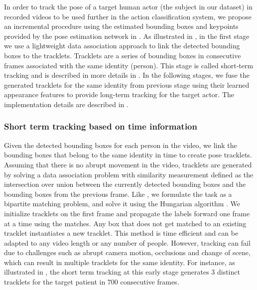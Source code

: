 In order to track the pose of a target human actor (the subject in our dataset) in recorded videos to be used further in the action classification system, we propose an incremental procedure using the estimated bounding boxes and keypoints provided by the pose estimation network in . As illustrated in , in the first stage we use a lightweight data association approach to link the detected bounding boxes to the tracklets. Tracklets are a series of bounding boxes in consecutive frames associated with the same identity (person). This stage is called short-term tracking and is described in more details in . In the following stages, we fuse the generated tracklets for the same identity from previous stage using their learned appearance features to provide long-term tracking for the target actor. The implementation details are described in .
\\
\subsubsection{Short term tracking based on time information}
\Tracking
\label{sec:Hungarian}
Given the detected bounding boxes for each person in the video, we link the bounding boxes that belong to the same identity in time to create pose tracklets. Assuming that there is no abrupt movement in the video, tracklets are generated by solving a data association problem with similarity measurement defined as the intersection over union between the currently detected bounding boxes and the bounding boxes from the previous frame. Like \cite{girdhar2018detect, pirsiavash2011globally}, we formulate the task as a bipartite matching problem, and solve it using the
Hungarian algorithm \cite{kuhn2005hungarian}. We initialize tracklets on the first frame and propagate the labels forward one frame at a time using the matches. Any box that does not get matched to an existing tracklet instantiates a new tracklet. This method is time efficient and can be adapted to any video length or any number of people. However, tracking can fail due to challenges such as abrupt camera motion, occlusions and change of scene, which can result in multiple tracklets for the same identity. For instance, as illustrated in , the short term tracking at this early stage generates 3 distinct tracklets for the target patient in 700 consecutive frames.
\\
